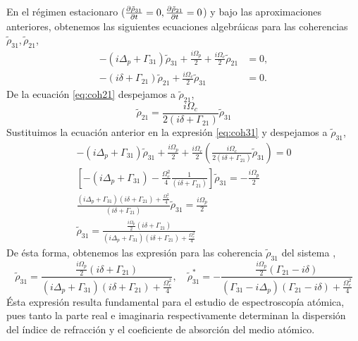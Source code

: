 En el régimen estacionaro ($\pdv{\tilde{\rho}_{31}}{t}= 0 , \pdv{\tilde{\rho}_{21}}{t}= 0$) y bajo las aproximaciones anteriores, obtenemos las siguientes ecuaciones algebráicas para las coherencias $\tilde{\rho}_{31}, \tilde{\rho}_{21}$,
\begin{subequations}
    \begin{align}
        -(i\Delta_p + \Gamma_{31}) \tilde{\rho}_{31} + \frac{i\Omega_p}{2} + \frac{i\Omega_c}{2} \tilde{\rho}_{21} &= 0, \label{eq:coh31}\\
        -\left(i\delta + \Gamma_{21}\right)\tilde{\rho}_{21} + \frac{i\Omega_c}{2}\tilde{\rho}_{31} &= 0. \label{eq:coh21}
    \end{align}
\end{subequations}
De la ecuación \ref{eq:coh21} despejamos a $\tilde{\rho}_{21}$,
\begin{equation}
    \tilde{\rho}_{21} = \frac{i \Omega_c}{ 2 \left(i\delta + \Gamma_{21}\right)}\tilde{\rho}_{31}
\end{equation}
Sustituimos la ecuación anterior en la expresión \ref{eq:coh31} y despejamos a $\tilde{\rho}_{31}$,
\begin{equation}
\begin{split}
    -(i\Delta_p + \Gamma_{31}) \tilde{\rho}_{31} + \frac{i\Omega_p}{2} + \frac{i\Omega_c}{2} \left(\frac{i \Omega_c}{ 2 \left(i\delta + \Gamma_{21}\right)}\tilde{\rho}_{31} \right) = 0\\
    \left[-(i\Delta_p + \Gamma_{31}) - \frac{\Omega_c^2}{4} \frac{1}{(i\delta + \Gamma_{21})} \right] \tilde{\rho}_{31} = - \frac{i\Omega_p}{2}\\
    \frac{(i\Delta_p + \Gamma_{31}) (i\delta + \Gamma_{21}) + \frac{\Omega_c^2}{4}}{(i\delta + \Gamma_{21})}\tilde{\rho}_{31} = \frac{i\Omega_p}{2}\\
    \tilde{\rho}_{31} = \frac{\frac{i\Omega_p}{2}(i\delta + \Gamma_{21})}{(i\Delta_p + \Gamma_{31}) (i\delta + \Gamma_{21}) + \frac{\Omega_c^2}{4}}
\end{split}
\end{equation}
De ésta forma, obtenemos las expresión para las coherencia $\tilde{\rho}_{31}$ del sistema \cite{robertw.boydNonlinearOptics,fleischhauerElectromagneticallyInducedTransparency2005},
\begin{equation}
\boxed{
    \tilde{\rho}_{31} = \frac{\frac{i\Omega_p}{2}(i\delta + \Gamma_{21})}{(i\Delta_p + \Gamma_{31}) (i\delta + \Gamma_{21}) + \frac{\Omega_c^2}{4}}, \quad \tilde{\rho}_{31}^* = -\frac{\frac{i\Omega_p}{2}(\Gamma_{21}- i\delta)}{(\Gamma_{31}- i\Delta_p ) (\Gamma_{21}- i\delta) + \frac{\Omega_c^2}{4}}
}
\end{equation}
Ésta expresión resulta fundamental para el estudio de espectroscopía atómica, pues tanto la parte real e imaginaria respectivamente determinan la dispersión del índice de refracción y el coeficiente de absorción del medio atómico.

